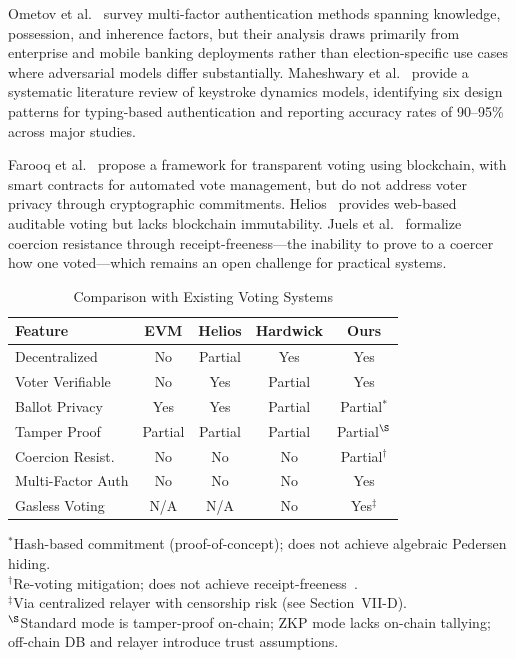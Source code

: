 \documentclass[conference]{IEEEtran}
\begin{document}
Ometov et al.~\cite{ometov2018} survey multi-factor authentication methods spanning knowledge, possession, and inherence factors, but their analysis draws primarily from enterprise and mobile banking deployments rather than election-specific use cases where adversarial models differ substantially. Maheshwary et al.~\cite{maheshwary2022} provide a systematic literature review of keystroke dynamics models, identifying six design patterns for typing-based authentication and reporting accuracy rates of 90--95\% across major studies.

Farooq et al.~\cite{farooq2022} propose a framework for transparent voting using blockchain, with smart contracts for automated vote management, but do not address voter privacy through cryptographic commitments. Helios~\cite{adida2008} provides web-based auditable voting but lacks blockchain immutability. Juels et al.~\cite{juels2005} formalize coercion resistance through receipt-freeness---the inability to prove to a coercer how one voted---which remains an open challenge for practical systems.

\begin{table}[htbp]
\centering
\caption{Comparison with Existing Voting Systems}
\label{tab:comparison}
\renewcommand{\arraystretch}{1.1}
\scriptsize
\begin{tabular}{|p{2cm}|c|c|c|c|}
\hline
\textbf{Feature} & \textbf{EVM} & \textbf{Helios} & \textbf{Hardwick} & \textbf{Ours} \\
\hline
Decentralized & No & Partial & Yes & Yes \\
\hline
Voter Verifiable & No & Yes & Partial & Yes \\
\hline
Ballot Privacy & Yes & Yes & Partial & Partial$^*$ \\
\hline
Tamper Proof & Partial & Partial & Partial & Partial$^\S$ \\
\hline
Coercion Resist. & No & No & No & Partial$^\dagger$ \\
\hline
Multi-Factor Auth & No & No & No & Yes \\
\hline
Gasless Voting & N/A & N/A & No & Yes$^\ddagger$ \\
\hline
\end{tabular}

\vspace{2pt}
\scriptsize{$^*$Hash-based commitment (proof-of-concept); does not achieve algebraic Pedersen hiding.\\
$^\dagger$Re-voting mitigation; does not achieve receipt-freeness~\cite{juels2005}.\\
$^\ddagger$Via centralized relayer with censorship risk (see Section~VII-D).\\
$^\S$Standard mode is tamper-proof on-chain; ZKP mode lacks on-chain tallying; off-chain DB and relayer introduce trust assumptions.}
\end{table}
\end{document}
